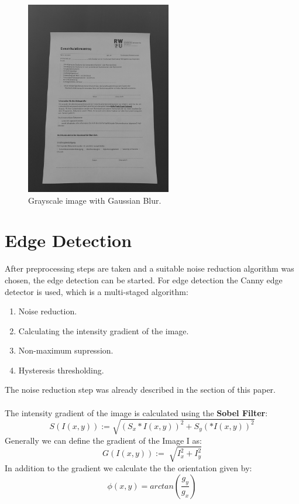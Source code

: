 \documentclass[twocolumn,10pt]{asme2ej}
\begin{document}
\noindent
\begin{figure}[H]
    \centerline{\includegraphics[width=2.5in]{output/hoch_3_3_gaussianblur.jpg}}
    \caption{Grayscale image with Gaussian Blur.}
    \label{fig:grayscale}
\end{figure}

\section{Edge Detection}
\label{section:edgedetection}
\noindent
After preprocessing steps are taken and a suitable noise reduction algorithm was chosen, the edge detection can be started.
For edge detection the Canny edge\cite{canny_paper} detector is used, which is a multi-staged algorithm:
\begin{enumerate}
    \item Noise reduction.
    \item Calculating the intensity gradient of the image.
    \item Non-maximum supression.
    \item Hysteresis thresholding.
\end{enumerate}
The noise reduction step was already described in the  section of this paper.
\\\\
The intensity gradient of the image is calculated using the \textbf{Sobel Filter}:
\begin{equation}
    S(I(x,y)) :=\sqrt{(S_x*I(x,y))^2 + S_y(*I(x,y))^2}
\end{equation}
Generally we can define the gradient of the Image I as:
\begin{equation}
    G(I(x,y)) := \sqrt[]{I_x^2 +I_y^2}
\end{equation}
\noindent
In addition to the gradient we calculate the the orientation given by:
\begin{equation}
    \phi(x,y) = arctan(\frac{g_y}{g_x})
\end{equation}
\end{document}
